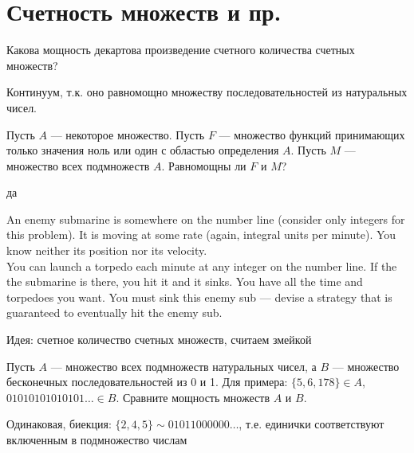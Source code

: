 \section{Счетность множеств и пр.} 

\begin{problem}
Какова мощность декартова произведение счетного количества счетных множеств? 
\end{problem} 
\begin{solution} 
Континуум, т.к. оно равномощно множеству последовательностей из натуральных чисел.
\end{solution}

\begin{problem}
Пусть $A$ --- некоторое множество. Пусть $F$ --- множество функций принимающих только значения ноль или один с областью определения $A$. Пусть $M$ --- множество всех подмножеств $A$. Равномощны ли $F$ и $M$?
\end{problem} 
\begin{solution} 
да
\end{solution}

\begin{problem}
 An enemy submarine is somewhere on the number line (consider only integers for this problem). It is moving at some rate (again, integral units per minute). You know neither its position nor its velocity.\\
You can launch a torpedo each minute at any integer on the number line. If the the submarine is there, you hit it and it sinks. You have all the time and torpedoes you want. You must sink this enemy sub --- devise a strategy that is guaranteed to eventually hit the enemy sub.
\end{problem} 
\begin{solution} 
Идея: счетное количество счетных множеств, считаем змейкой 
\end{solution}

\begin{problem}
Пусть $A$ --- множество всех подмножеств натуральных чисел, а $ B $ --- множество бесконечных последовательностей из 0 и 1. Для примера: $\{5,6,178\}\in A$, $01010101010101\ldots \in B$. Сравните мощность множеств $ A $ и $ B $.
\end{problem} 
\begin{solution} 
Одинаковая, биекция: $\{2,4,5\}\sim 01011000000\ldots$, т.е. единички соответствуют включенным в подмножество числам
\end{solution}

